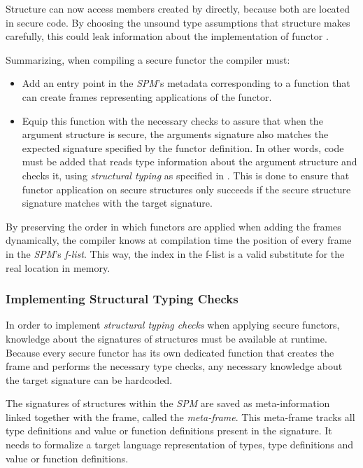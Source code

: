 \begin{description}
Structure  can now access members created by  directly, because both are located in secure code.
By choosing the unsound type assumptions that structure  makes carefully, this could leak information about the implementation of functor .

Summarizing, when compiling a secure functor the compiler must: %
\begin{itemize}
\item Add an entry point in the \emph{SPM}'s metadata corresponding to a function that can create frames representing applications of the functor.
\item Equip this function with the necessary checks to assure that when the argument structure is secure, the arguments signature also matches the expected signature specified by the functor definition.
In other words, code must be added that reads type information about the argument structure and checks it, using \emph{structural typing} as specified in . This is done to ensure that functor application on secure structures only succeeds if the secure structure signature matches with the target signature.
\end{itemize}

By preserving the order in which functors are applied when adding the frames dynamically, the compiler knows at compilation time the position of every frame in the \emph{SPM}'s \emph{f-list}.
This way, the index in the f-list is a valid substitute for the real location  in memory.
\end{description}

\subsubsection{Implementing Structural Typing Checks}
In order to implement \emph{structural typing checks} when applying secure functors, knowledge about the signatures of structures must be available at runtime.
Because every secure functor has its own dedicated function that creates the frame and performs the necessary type checks, any necessary knowledge about the target signature can be hardcoded.

The signatures of structures within the \emph{SPM} are saved as meta-information linked together with the frame, called the \emph{meta-frame}.
This meta-frame tracks all type definitions and value or function definitions present in the signature.
It needs to formalize a target language representation of types, type definitions and value or function definitions.


